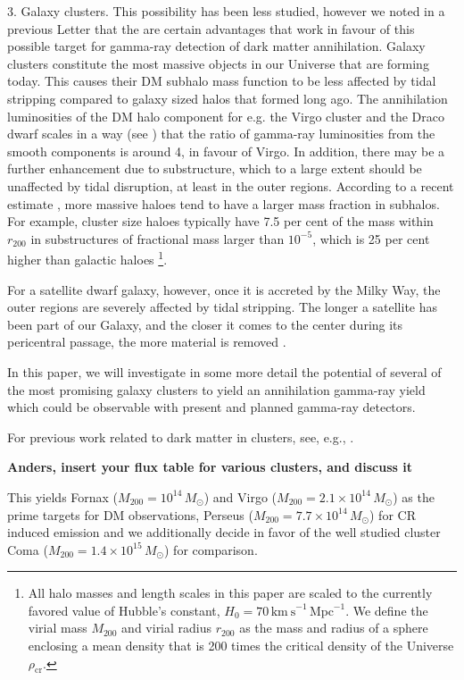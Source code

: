 \documentclass[10pt,aps,pra,reprint,amsmath,amsfonts,amssymb,showpacs]{revtex4-1}
\def\del#1{{}}
\newcommand{\rmn}{\mathrm}
\newcommand{\msun}{M_\odot}
\newcommand{\rvir}{r_{200}}
\newcommand{\mvir}{M_{200}}
\begin{document}
3. Galaxy clusters. This possibility has been less studied, however we
noted in a previous Letter \cite{2009PhRvL.103r1302P} that the are
certain advantages that work in favour of this possible target for
gamma-ray detection of dark matter annihilation.  Galaxy clusters
constitute the most massive objects in our Universe that are forming
today. This causes their DM subhalo mass function to be less affected
by tidal stripping compared to galaxy sized halos that formed long
ago.  The annihilation luminosities of the DM halo component for
e.g. the Virgo cluster and the Draco dwarf scales in a way (see
\cite{2009PhRvL.103r1302P}) that the ratio of gamma-ray luminosities
from the smooth components is around 4, in favour of Virgo. In
addition, there may be a further enhancement due to substructure,
which to a large extent should be unaffected by tidal disruption, at
least in the outer regions.  According to a recent estimate
\cite{2011MNRAS.410.2309G}, more massive haloes tend to have a larger
mass fraction in subhalos.  For example, cluster size haloes typically
have 7.5 per cent of the mass within $r_{200}$ in substructures of
fractional mass larger than $10^{-5}$, which is 25 per cent higher
than galactic haloes \footnote{All halo masses and length scales in
  this paper are scaled to the currently favored value of Hubble's
  constant, $H_0 = 70\, \rmn{km~s}^{-1}\,\rmn{Mpc}^{-1}$. We define the
  virial mass $\mvir$ and virial radius $\rvir$ as the mass and radius
  of a sphere enclosing a mean density that is 200 times the critical
  density of the Universe $\rho_{\rmn{cr}}$.}.

For a satellite dwarf galaxy, however, once it is accreted by the
Milky Way, the outer regions are severely affected by tidal
stripping. The longer a satellite has been part of our Galaxy, and the
closer it comes to the center during its pericentral passage, the more
material is removed \cite{2004MNRAS.355..819G}.

In this paper, we will investigate in some more detail the potential
of several of the most promising galaxy clusters to yield an
annihilation gamma-ray yield which could be observable with present
and planned gamma-ray detectors.

For previous work related to dark matter in clusters, see, e.g.,
\cite{2006A&A...455...21C,2009PhRvD..80b3005J}. 


{\bf Anders, insert your flux table for various clusters, and discuss it}

This yields Fornax ($\mvir=10^{14}\,\msun$) and Virgo
($\mvir=2.1\times10^{14}\,\msun$) \del{\cite{}} as the prime targets for DM
observations, Perseus ($\mvir=7.7\times10^{14}\,\msun$) for CR induced
emission and we additionally decide in favor of the well studied
cluster Coma ($\mvir=1.4\times10^{15}\,\msun$) for comparison.
\end{document}
